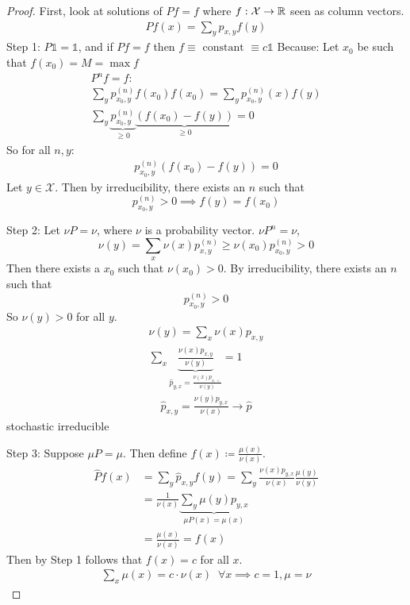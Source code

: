 \documentclass[mfit.tex]{subfiles}
\begin{document}
\begin{proof}
  First, look at solutions of $P f = f$ where $f: \mathcal{X} \to \mathbb{R}$ seen as column vectors.
  \begin{align*}
    P f (x) = \sum_y p_{x,y} f(y)
  \end{align*}
  Step 1: $P \mathbb{1} = \mathbb{1}$, and if $P f = f$ then $f \equiv \text{ constant } \equiv c \mathbb{1}$
  Because: Let $x_0$ be such that $f(x_0) = M = \max f$
  \begin{align*}
    P^n f = f: \\
    \sum_y p^{(n)}_{x_0,y} f(x_0) f(x_0) = \sum_y p^{(n)}_{x_0,y}(x) f(y) \\
    \sum_y \underbrace{p_{x_0,y}^{(n)}}_{\geq 0} \underbrace{(f(x_0)-f(y))}_{\geq 0} = 0
  \end{align*}
  So for all $n,y$: 
  \begin{align*}
    p_{x_0,y}^{(n)} (f(x_0)-f(y)) = 0
  \end{align*}
  Let $y \in \mathcal{X}$. Then by irreducibility, there exists an $n$ such that
  \[ p_{x_0,y}^{(n)} > 0 \implies f(y) = f(x_0) \]
  
  Step 2: Let $\nu P = \nu$, where $\nu$ is a probability vector.
  $\nu P^n = \nu$,
  \[ \nu(y) = \sum_x \nu(x) p_{x,y}^{(n)} \geq \nu(x_0) p_{x_0,y}^{(n)} > 0 \]
  Then there exists a $x_0$ such that $\nu(x_0) > 0$.
  By irreducibility, there exists an $n$ such that
  \[ p_{x_0,y}^{(n)} > 0 \]
  So $\nu(y) > 0$ for all $y$.
  \begin{align*}
    \nu(y) = \sum_x \nu(x) p_{x,y} \\
    \sum_x \underbrace{\frac{\nu(x) p_{x,y}}{\nu(y)}}_{\hat{p}_{y,x} = \frac{\nu(x) p_{x,<}}{\nu(y)}} = 1
  \end{align*}
  \begin{align*}
    \hat{p}_{x,y} = \frac{\nu(y)p_{y,x}}{\nu(x)} \to \hat{p}
  \end{align*}
  stochastic irreducible
  
  Step 3: Suppose $\mu P = \mu$. Then define $f(x) \coloneqq \frac{\mu(x)}{\nu(x)}$.
  \begin{align*}
    \hat{P} f(x) &= \sum_y \hat{p}_{x,y} f(y) = \sum_y \frac{\nu(x)p_{y,x}}{\nu(x)} \frac{\mu(y)}{\nu(y)} \\
    &= \frac{1}{\nu(x)} \underbrace{\sum_y \mu(y) p_{y,x}}_{\mu P(x) = \mu(x)} \\
    &= \frac{\mu(x)}{\nu(x)} = f(x)
  \end{align*}
  Then by Step 1 follows that $f(x) = c$ for all $x$.
  \begin{align*}
    \sum_x \mu(x) = c \cdot \nu(x) \;\; \forall x \implies c = 1, \mu = \nu
  \end{align*}
\end{proof}
\end{document}
